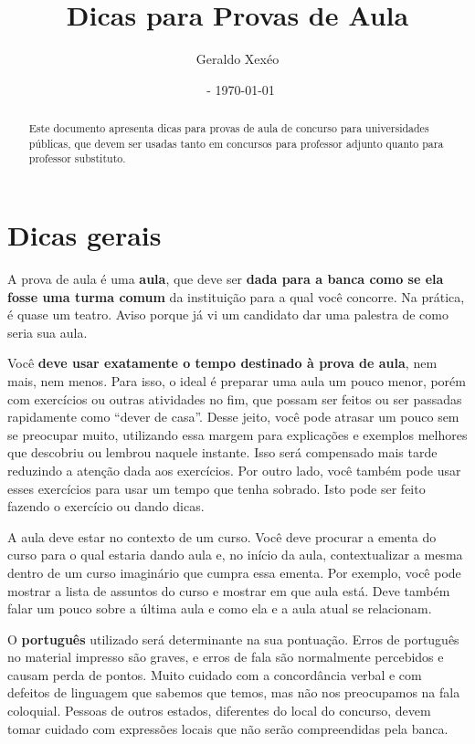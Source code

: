 \documentclass{article}
\title{Dicas para Provas de Aula}
\author{Geraldo Xexéo}
\affil{\url{xexeo@ufrj.br} \\
\url{http://xexeo.net}}
\date{\ccbyncsa\  - \today}
\begin{document}
\maketitle

\begin{abstract}
    Este documento apresenta dicas para provas de aula de concurso para universidades públicas, que devem ser usadas tanto em concursos para professor adjunto quanto para professor substituto.
\end{abstract}




\section{Dicas gerais}



A prova de aula é uma \textbf{aula}, que deve ser \textbf{dada para a banca como se ela fosse uma turma comum} da instituição para a qual você concorre. Na prática, é quase um teatro. Aviso porque já vi um candidato dar uma palestra de como seria sua aula.

Você \textbf{deve usar exatamente o tempo destinado à prova de aula}, nem mais, nem menos. Para isso, o ideal é preparar uma aula um pouco menor, porém com exercícios ou outras atividades no fim, que possam ser feitos ou ser passadas rapidamente como ``dever de casa''.
Desse jeito, você pode atrasar um pouco sem se preocupar muito, utilizando essa margem para explicações e exemplos melhores que descobriu ou lembrou naquele instante. Isso será compensado mais tarde reduzindo a atenção dada aos exercícios.
Por outro lado, você também pode usar esses exercícios para usar um tempo que tenha sobrado. Isto pode ser feito fazendo o exercício ou dando dicas.

A aula deve estar no contexto de um curso. Você deve procurar a ementa do curso para o qual estaria dando aula e, no início da aula, contextualizar a mesma dentro de um curso imaginário que cumpra essa ementa. Por exemplo, você pode mostrar a lista de assuntos do curso e mostrar em que aula está. Deve também falar um pouco sobre a última aula e como ela e a aula atual se relacionam.

O \textbf{português} utilizado será determinante na sua pontuação. Erros de português no material impresso são graves, e erros de fala são normalmente percebidos e causam perda de pontos. Muito cuidado com a concordância verbal e com defeitos de linguagem que sabemos que temos, mas não nos preocupamos na fala coloquial. Pessoas de outros estados, diferentes do local do concurso, devem tomar cuidado com expressões locais que não serão compreendidas pela banca.
\end{document}
